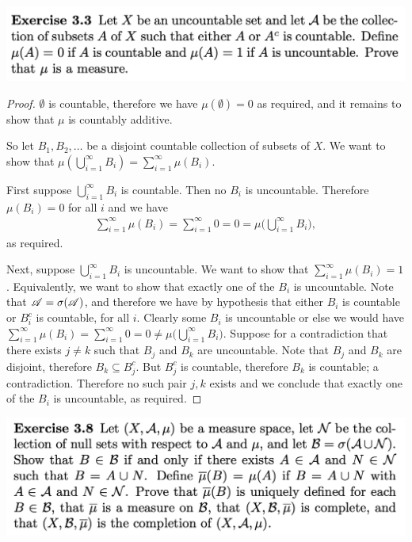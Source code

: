 \newpage
\begin{mdframed}
\includegraphics[width=400pt]{img/analysis--berkeley-202a-hw04-b168.png}
\end{mdframed}
\begin{proof}
  $\emptyset$ is countable, therefore we have $\mu(\emptyset) = 0$ as required, and it remains to show
  that $\mu$ is countably additive.

  So let $B_1, B_2, \dots$ be a disjoint countable collection of subsets of $X$. We want to show
  that $\mu(\bigcup_{i=1}^\infty B_i) = \sum_{i=1}^\infty \mu(B_i)$.


  First suppose $\bigcup_{i=1}^\infty B_i$ is countable. Then no $B_i$ is uncountable. Therefore $\mu(B_i) = 0$
  for all $i$ and we have
  \begin{align*}
    \sum_{i=1}^\infty \mu(B_i) = \sum_{i=1}^\infty 0 = 0 = \mu\big(\bigcup_{i=1}^\infty B_i\big),
  \end{align*}
  as required.

  Next, suppose $\bigcup_{i=1}^\infty B_i$ is uncountable. We want to show
  that $\sum_{i=1}^\infty \mu(B_i) = 1$. Equivalently, we want to show that exactly one of the $B_i$ is
  uncountable. Note that $\mathscr A = \sigma(\mathscr A)$, and therefore we have by hypothesis that either $B_i$ is
  countable or $B_i^c$ is countable, for all $i$. Clearly some $B_i$ is uncountable or else we would
  have $\sum_{i=1}^\infty \mu(B_i) = \sum_{i=1}^\infty 0 = 0 \neq \mu\big(\bigcup_{i=1}^\infty B_i\big)$.
  Suppose for a contradiction that there exists $j \neq k$ such that $B_j$ and $B_k$ are uncountable. Note
  that $B_j$ and $B_k$ are disjoint, therefore $B_k \subseteq B_j^c$. But $B_j^c$ is countable, therefore $B_k$
  is countable; a contradiction. Therefore no such pair $j, k$ exists and we conclude that exactly one of
  the $B_i$ is uncountable, as required.
\end{proof}

\newpage
\begin{mdframed}
\includegraphics[width=400pt]{img/analysis--berkeley-202a-hw04-c88b.png}
\end{mdframed}

